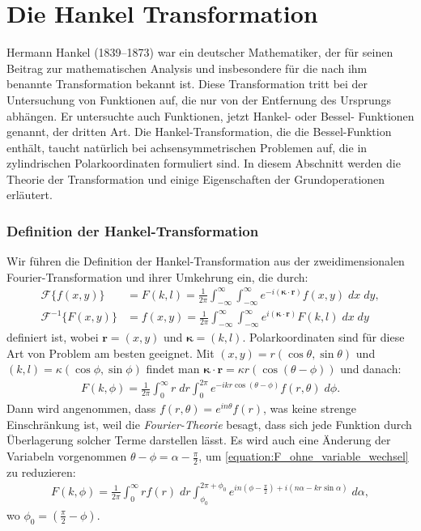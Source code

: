 %
%

\section{Die Hankel Transformation \label{kreismembran:section:teil2}}

Hermann Hankel (1839--1873) war ein deutscher Mathematiker, der für seinen Beitrag zur mathematischen Analysis und insbesondere für die nach ihm benannte Transformation bekannt ist.
Diese Transformation tritt bei der Untersuchung von Funktionen auf, die nur von der Entfernung des Ursprungs abhängen.
Er untersuchte auch Funktionen, jetzt Hankel- oder Bessel- Funktionen genannt, der dritten Art.
Die Hankel-Transformation, die die Bessel-Funktion enthält, taucht natürlich bei achsensymmetrischen Problemen auf, die in zylindrischen Polarkoordinaten formuliert sind.
In diesem Abschnitt werden die Theorie der Transformation und einige Eigenschaften der Grundoperationen erläutert.

\subsubsection{Definition der Hankel-Transformation \label{subsub:hankel_tansformation}}
Wir führen die Definition der Hankel-Transformation \cite{lokenath_debnath_integral_2015} aus der zweidimensionalen Fourier-Transformation und ihrer Umkehrung ein, die durch:
\begin{align}
	\mathscr{F}\{f(x,y)\} & = F(k,l)=\frac{1}{2\pi}\int_{-\infty}^{\infty}\int_{-\infty}^{\infty}e^{-i( \bm{\kappa}\cdot \mathbf{r})}f(x,y) \; dx \; dy,\label{equation:fourier_transform}\\
	\mathscr{F}^{-1}\{F(x,y)\} & = f(x,y)=\frac{1}{2\pi}\int_{-\infty}^{\infty}\int_{-\infty}^{\infty}e^{i(\bm{\kappa}\cdot \mathbf{r})}F(k,l) \; dx \; dy \label{equation:inv_fourier_transform}
\end{align}
definiert ist, wobei $\mathbf{r}=(x,y)$ und $\bm{\kappa}=(k,l)$. Polarkoordinaten sind für diese Art von Problem am besten geeignet. Mit $(x,y)=r(\cos\theta,\sin\theta)$ und $(k,l)=\kappa(\cos\phi,\sin\phi)$ findet man $\bm{\kappa}\cdot\mathbf{r}=\kappa r(\cos(\theta-\phi))$ und danach:
\begin{align}
	F(k,\phi)=\frac{1}{2\pi}\int_{0}^{\infty}r \; dr \int_{0}^{2\pi}e^{-ikr\cos(\theta-\phi)}f(r,\theta) \; d\phi.
	\label{equation:F_ohne_variable_wechsel}
\end{align}
Dann wird angenommen, dass $f(r,\theta)=e^{in\theta}f(r)$, was keine strenge Einschränkung ist, weil die \textit{Fourier-Theorie} besagt, dass sich jede Funktion durch Überlagerung solcher Terme darstellen lässt. Es wird auch eine Änderung der Variabeln vorgenommen $\theta-\phi=\alpha-\frac{\pi}{2}$, um \eqref{equation:F_ohne_variable_wechsel} zu reduzieren:
\begin{align}
	F(k,\phi)=\frac{1}{2\pi}\int_{0}^{\infty}rf(r) \; dr \int_{\phi_{0}}^{2\pi+\phi_{0}}e^{in(\phi-\frac{\pi}{2})+i(n\alpha-kr\sin\alpha)} \; d\alpha,
	\label{equation:F_ohne_bessel}
\end{align}
wo $\phi_{0}=(\frac{\pi}{2}-\phi)$.

